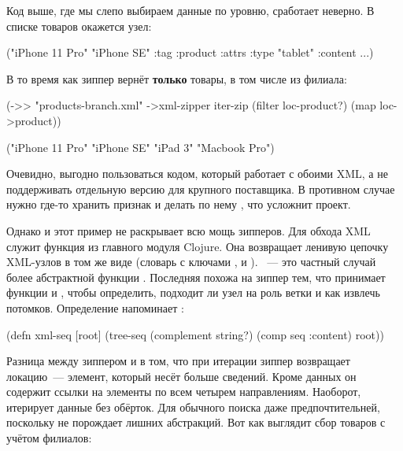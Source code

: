 Код выше, где мы слепо выбираем данные по уровню, сработает неверно. В списке
товаров окажется узел:

\begin{english}
  \begin{clojure}
("iPhone 11 Pro"
 "iPhone SE"
 {:tag :product :attrs {:type "tablet"} :content ...})
  \end{clojure}
\end{english}

В то время как зиппер вернёт \textbf{только} товары, в том числе из филиала:

\begin{english}
  \begin{clojure}
(->> "products-branch.xml"
     ->xml-zipper
     iter-zip
     (filter loc-product?)
     (map loc->product))

("iPhone 11 Pro" "iPhone SE" "iPad 3" "Macbook Pro")
  \end{clojure}
\end{english}

Очевидно, выгодно пользоваться кодом, который работает с обоими XML, а не
поддерживать отдельную версию для крупного поставщика. В противном случае нужно
где-то хранить признак и делать по нему , что усложнит проект.

Однако и этот пример не раскрывает всю мощь зипперов. Для обхода XML служит
функция  из главного модуля Clojure. Она возвращает ленивую цепочку
XML-узлов в том же виде (словарь с ключами ,  и
). ~--- это частный случай более абстрактной функции
. Последняя похожа на зиппер тем, что принимает функции  и
, чтобы определить, подходит ли узел на роль ветки и как извлечь
потомков. Определение  напоминает :

\begin{english}
  \begin{clojure}
(defn xml-seq
  [root]
  (tree-seq (complement string?)
            (comp seq :content)
            root))
  \end{clojure}
\end{english}

Разница между зиппером и  в том, что при итерации зиппер возвращает
локацию~--- элемент, который несёт больше сведений. Кроме данных он содержит
ссылки на элементы по всем четырем направлениям. Наоборот,  итерирует
данные без обёрток. Для обычного поиска  даже предпочтительней,
поскольку не порождает лишних абстракций. Вот как выглядит сбор товаров с учётом
филиалов:

